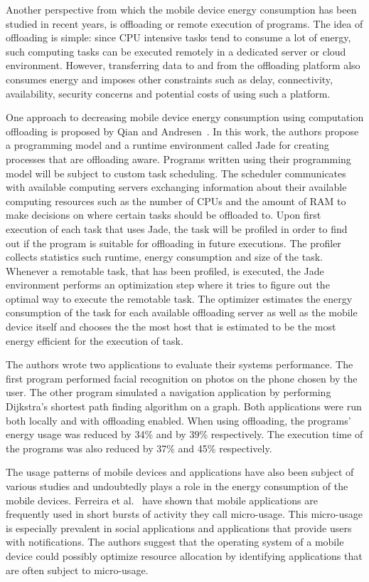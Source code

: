 Another perspective from which the mobile device energy consumption has been studied in recent years, is offloading or remote execution of programs. The idea of offloading is simple: since CPU intensive tasks tend to consume a lot of energy, such computing tasks can be executed remotely in a dedicated server or cloud environment. However, transferring data to and from the offloading platform also consumes energy and imposes other constraints such as delay, connectivity, availability, security concerns and potential costs of using such a platform.

One approach to decreasing mobile device energy consumption using computation offloading is proposed by Qian and Andresen~\cite{7176219}. In this work, the authors propose a programming model and a runtime environment called Jade for creating processes that are offloading aware. Programs written using their programming model will be subject to custom task scheduling. The scheduler communicates with available computing servers exchanging information about their available computing resources such as the number of CPUs and the amount of RAM to make decisions on where certain tasks should be offloaded to. Upon first execution of each task that uses Jade, the task will be profiled in order to find out if the program is suitable for offloading in future executions. The profiler collects statistics such runtime, energy consumption and size of the task. Whenever a remotable task, that has been profiled, is executed, the Jade environment performs an optimization step where it tries to figure out the optimal way to execute the remotable task. The optimizer estimates the energy consumption of the task for each available offloading server as well as the mobile device itself and chooses the the most host that is estimated to be the most energy efficient for the execution of task.

The authors wrote two applications to evaluate their systems performance. The first program performed facial recognition on photos on the phone chosen by the user. The other program simulated a navigation application by performing Dijkstra's shortest path finding algorithm on a graph. Both applications were run both locally and with offloading enabled. When using offloading, the programs' energy usage was reduced by 34\% and by 39\% respectively. The execution time of the programs was also reduced by 37\% and 45\% respectively.                 


The usage patterns of mobile devices and applications have also been subject of various studies and undoubtedly plays a role in the energy consumption of the mobile devices. Ferreira et al.~\cite{Ferreira:2014:CES:2628363.2628367} have shown that mobile applications are frequently used in short bursts of activity they call micro-usage. This micro-usage is especially prevalent in social applications and applications that provide users with notifications. The authors suggest that the operating system of a mobile device could possibly optimize resource allocation by identifying applications that are often subject to micro-usage.

